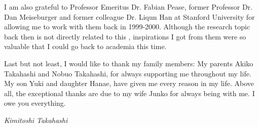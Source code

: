 I am also grateful to Professor Emeritus Dr. Fabian Pease, former Professor Dr. Dan Meiseburger and former colleague Dr. Liqun Han at Stanford University for allowing me to work with them back in 1999-2000.
Although the research topic back then is not directly related to this , inspirations I got from them were so valuable that I could go back to academia this time.



Last but not least, I would like to thank my family members: My parents Akiko Takahashi and Nobuo Takahashi, for always supporting me throughout my life.
My son Yuki and daughter Hanae, have given me every reason in my life.
Above all, the exceptional thanks are due to my wife Junko for always being with me. I owe you everything.


\begin{flushright}
{\em\Large Kimitoshi Takahashi} \par{}
\end{flushright}





